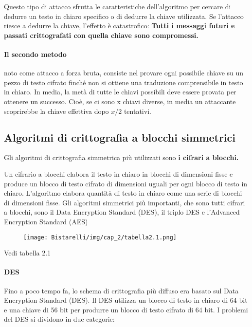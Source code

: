 \singlespacing

Questo tipo di attacco sfrutta le caratteristiche dell'algoritmo per cercare di dedurre un testo in chiaro specifico o di dedurre la chiave utilizzata. Se l'attacco riesce a dedurre la chiave, l'effetto è catastrofico: \textbf{Tutti i messaggi futuri e passati crittografati con quella chiave sono compromessi.}

\singlespacing

\paragraph{Il secondo metodo} noto come attacco a forza bruta, consiste nel provare ogni possibile chiave su un pezzo di testo cifrato finché non si ottiene una traduzione comprensibile in testo in chiaro. In media, la metà di tutte le chiavi possibili deve essere provata per ottenere un successo. Cioè, se ci sono x chiavi diverse, in media un attaccante scoprirebbe la chiave effettiva dopo $x/2$ tentativi.

\subsection{Algoritmi di crittografia a blocchi simmetrici}
Gli algoritmi di crittografia simmetrica più utilizzati sono \textbf{i cifrari a blocchi.} 

\singlespacing

Un cifrario a blocchi elabora il testo in chiaro in blocchi di dimensioni fisse e produce un blocco di testo cifrato di dimensioni uguali per ogni blocco di testo in chiaro. L'algoritmo elabora quantità di testo in chiaro come una serie di blocchi di dimensioni fisse. Gli algoritmi simmetrici più importanti, che sono tutti cifrari a blocchi, sono il Data Encryption Standard (DES), il triplo DES e l'Advanced Encryption Standard (AES)

\begin{figure}[H]
	\centering
    \texttt{[image: Bistarelli/img/cap\_2/tabella2.1.png]}
\end{figure}


Vedi tabella 2.1

\paragraph{DES} Fino a poco tempo fa, lo schema di crittografia più diffuso era basato sul Data Encryption Standard (DES). Il DES utilizza un blocco di testo in chiaro di 64 bit e una chiave di 56 bit per produrre un blocco di testo cifrato di 64 bit. I problemi del DES si dividono in due categorie: 

